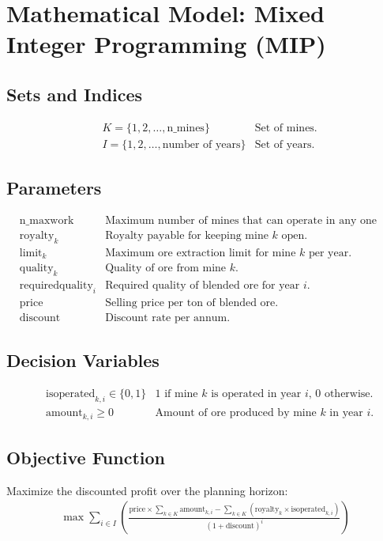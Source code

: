 \documentclass{article}
\begin{document}
\section*{Mathematical Model: Mixed Integer Programming (MIP)}

\subsection*{Sets and Indices}
\begin{align*}
& K = \{1, 2, \ldots, \text{n\_mines}\} & \text{Set of mines.} \\
& I = \{1, 2, \ldots, \text{number of years}\} & \text{Set of years.}
\end{align*}

\subsection*{Parameters}
\begin{align*}
& \text{n\_maxwork} & \text{Maximum number of mines that can operate in any one year.} \\
& \text{royalty}_k & \text{Royalty payable for keeping mine $k$ open.} \\
& \text{limit}_k & \text{Maximum ore extraction limit for mine $k$ per year.} \\
& \text{quality}_k & \text{Quality of ore from mine $k$.} \\
& \text{requiredquality}_i & \text{Required quality of blended ore for year $i$.} \\
& \text{price} & \text{Selling price per ton of blended ore.} \\
& \text{discount} & \text{Discount rate per annum.}
\end{align*}

\subsection*{Decision Variables}
\begin{align*}
& \text{isoperated}_{k,i} \in \{0, 1\} & \text{1 if mine $k$ is operated in year $i$, 0 otherwise.} \\
& \text{amount}_{k,i} \geq 0 & \text{Amount of ore produced by mine $k$ in year $i$.}
\end{align*}

\subsection*{Objective Function}
Maximize the discounted profit over the planning horizon:
\begin{align*}
\max \sum_{i \in I} \left(\frac{\text{price} \times \sum_{k \in K} \text{amount}_{k,i} - \sum_{k \in K} (\text{royalty}_k \times \text{isoperated}_{k,i})}{(1 + \text{discount})^i}\right)
\end{align*}
\end{document}
